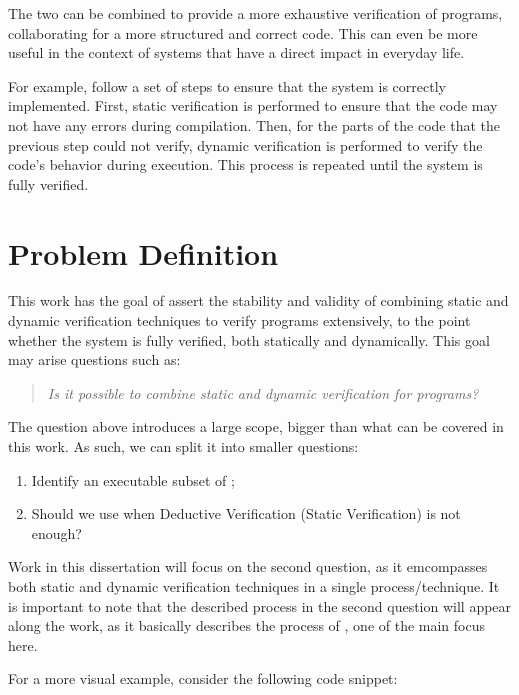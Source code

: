 The two can  be combined to provide a more exhaustive verification of \ocaml programs, 
collaborating for a more structured and correct code. This can even be more useful in the context of 
systems that have a direct impact in everyday life.

For example, \monitors follow a set of steps to ensure that the system is correctly implemented. 
First, static verification is performed to ensure that the code may not have any errors during compilation.
Then, for the parts of the code that the previous step could not verify, dynamic verification is performed 
to verify the code's behavior during execution. This process is repeated until the system is fully verified.

\section{Problem Definition}
\label{sec:problem_definition}

This work has the goal of assert the stability and validity of combining static and dynamic verification techniques 
to verify \ocaml programs extensively, to the point whether the system is fully verified, both statically and dynamically.
This goal may arise questions such as:

\begin{quote}
    \emph{Is it possible to combine static and dynamic verification for \ocaml programs?}
\end{quote}

The question above introduces a large scope, bigger than what can be covered in this work. 
As such, we can split it into smaller questions:

\begin{enumerate}
    \item Identify an executable subset of \gospellang;
    \item Should we use \rac when Deductive Verification (Static Verification) is not enough?
\end{enumerate}

Work in this dissertation will focus on the second question, as it emcompasses both static 
and dynamic verification techniques in a single process/technique. It is important to note that 
the described process in the second question will appear along the work, as it basically describes 
the process of \monitors, one of the main focus here.

For a more visual example, consider the following code snippet:

